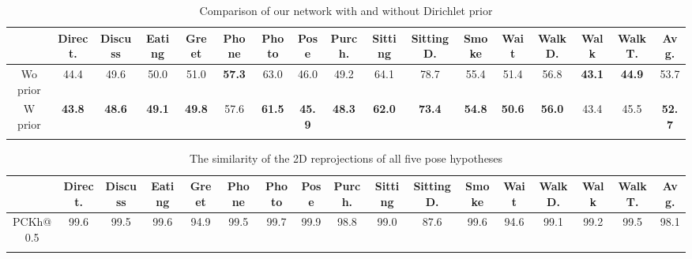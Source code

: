 \documentclass[10pt,twocolumn,letterpaper]{article}
\begin{document}
\begin{table*}[ht]
\caption{Comparison of our network with and without Dirichlet prior}
\vspace{-1mm}
\centering
\small
\setlength{\tabcolsep}{2pt}
\begin{tabular*}{0.96\textwidth}{ c c c c c c c c c c c c c c c c c } 
 \hline
 &  Direct. & Discuss & Eating & Greet & Phone & Photo & Pose & Purch. &  Sitting & SittingD. & Smoke  & Wait & WalkD. & Walk & WalkT. & Avg.\\ 
 \hline
 
Wo prior & 44.4 & 49.6 & 50.0 &51.0 & \bf 57.3 &63.0 & 46.0 &49.2 &64.1 &78.7 &55.4 &51.4 &56.8 & \bf 43.1 & \bf 44.9 &53.7\\
W prior & \bf 43.8 & \bf 48.6 & \bf 49.1 & \bf 49.8 &57.6 & \bf 61.5 & \bf 45.9 & \bf 48.3 & \bf 62.0 & \bf 73.4 &\bf 54.8 & \bf 50.6 & \bf 56.0 &43.4 &45.5 & \bf 52.7 \\\hline
\vspace{-3mm}

\end{tabular*}
\label{Tab:dirichletPrior}
\end{table*}


\begin{table*}[ht]

\caption{The similarity of the 2D reprojections of all five pose hypotheses  }
\vspace*{-1mm}
\centering
\small
\setlength{\tabcolsep}{2pt}
\begin{tabular*}{0.96\textwidth}{ c c c c c c c c c c c c c c c c c } 
 
 \hline
 &  Direct. & Discuss & Eating & Greet & Phone & Photo  & Pose & Purch. &  Sitting & SittingD. & Smoke & Wait & WalkD. & Walk & WalkT. & Avg.\\ 
 \hline
PCKh@0.5 & 99.6 &  99.5 &  99.6 &  94.9 & 99.5 &  99.7 &  99.9 &  98.8 &  99.0 &  87.6 & 99.6 &  94.6 & 99.1 &  99.2&  99.5 & 98.1 \\ \hline
\vspace{-3mm}
\end{tabular*}


\label{Tab:2D_reprojectionSimilarity}
\end{table*}
\end{document}
